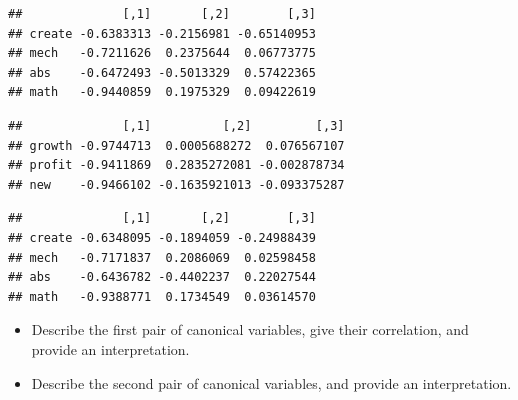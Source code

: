 \documentclass[
]{book}
\newenvironment{Shaded}{\begin{snugshade}}{\end{snugshade}}
\newcommand{\FunctionTok}[1]{\textcolor[rgb]{0.13,0.29,0.53}{\textbf{#1}}}
\newcommand{\NormalTok}[1]{#1}
\newcommand{\SpecialCharTok}[1]{\textcolor[rgb]{0.81,0.36,0.00}{\textbf{#1}}}
\theoremstyle{definition}
\theoremstyle{definition}
\theoremstyle{definition}
\theoremstyle{definition}
\theoremstyle{remark}
\begin{document}
\begin{Shaded}
\end{Shaded}

\begin{verbatim}
##              [,1]       [,2]        [,3]
## create -0.6383313 -0.2156981 -0.65140953
## mech   -0.7211626  0.2375644  0.06773775
## abs    -0.6472493 -0.5013329  0.57422365
## math   -0.9440859  0.1975329  0.09422619
\end{verbatim}

\begin{Shaded}
\end{Shaded}

\begin{verbatim}
##              [,1]          [,2]         [,3]
## growth -0.9744713  0.0005688272  0.076567107
## profit -0.9411869  0.2835272081 -0.002878734
## new    -0.9466102 -0.1635921013 -0.093375287
\end{verbatim}

\begin{Shaded}
\end{Shaded}

\begin{verbatim}
##              [,1]       [,2]        [,3]
## create -0.6348095 -0.1894059 -0.24988439
## mech   -0.7171837  0.2086069  0.02598458
## abs    -0.6436782 -0.4402237  0.22027544
## math   -0.9388771  0.1734549  0.03614570
\end{verbatim}

\begin{itemize}
\item
  Describe the first pair of canonical variables, give their correlation, and provide an interpretation.
\item
  Describe the second pair of canonical variables, and provide an interpretation.
\end{itemize}
\end{document}
